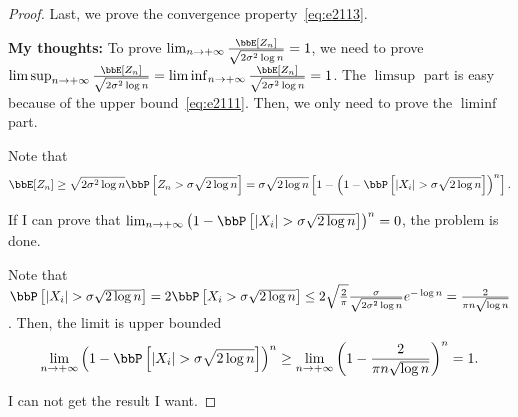 \documentclass[11pt]{article}
\newcommand{\of}[1]{\left(#1\right)}
\newcommand{\off}[1]{\left[#1\right]}
\theoremstyle{plain}
\theoremstyle{definition}
\begin{document}
\begin{proof}
	 \vspace{0.2cm}
	 Last, we prove the convergence property~\eqref{eq:e2113}.
	 
	\textbf{My thoughts:} To prove $\lim_{n \rightarrow +\infty}\frac{ \bbE[Z_n]}{\sqrt{2\sigma^2 \log n}}  = 1$, we need to prove $\limsup_{n \rightarrow +\infty}\frac{ \bbE[Z_n]}{\sqrt{2\sigma^2 \log n}}  = \liminf_{n \rightarrow +\infty}\frac{ \bbE[Z_n]}{\sqrt{2\sigma^2 \log n}} = 1$. The $\limsup$ part is easy because of the upper bound~\eqref{eq:e2111}. Then, we only need to prove the $\liminf$ part.
	
	Note that 
	\[\bbE[Z_n] \geq \sqrt{2 \sigma^2 \log n}  \bbP \off{Z_n > \sigma \sqrt{2 \log n}} =  \sigma \sqrt{2\log n} \off{1 - \of{1 - \bbP \off{|X_i| > \sigma \sqrt{2\log n}}   }^n}. \]
	
	If I can prove that $\lim_{n \rightarrow +\infty}\of{1 - \bbP \off{|X_i| > \sigma \sqrt{2\log n}}   }^n = 0 $, the problem is done.
	
	Note that $\bbP \off{|X_i| > \sigma \sqrt{2\log n}}  = 2 \bbP \off{X_i > \sigma \sqrt{2\log n}} \leq 2 \sqrt{\frac{2}{\pi}} \frac{\sigma}{\sqrt{2 \sigma^2 \log n}} e^{-\log n} = \frac{2}{\pi n \sqrt{\log n}}$. Then, the limit is upper bounded
	 \[\lim_{n \rightarrow +\infty}\of{1 - \bbP \off{|X_i| > \sigma \sqrt{2\log n}}   }^n \geq \lim_{n \rightarrow +\infty} \of{1 -  \frac{2}{\pi n \sqrt{\log n}} }^n = 1. \]
	 
	 I can not get the result I want.
	 
	 \iffalse
	 By Markov's inequality, the expectation of $Z_n$ satisfies
	 \begin{equation}
	 	\bbE[Z_n] \geq t \bbP[Z_n \geq t],\quad \text{for all }t \geq 0.
	 \end{equation}
	 By the independence of $\{X_i\}_{i=1}^n$, the tail probability of $Z_n$ is
	 \begin{equation}
	 	\bbP[Z_n \geq t] = 1 - (1 - \bbP(|X_1| \geq t))^n.
	 \end{equation}
	 
	 Let $t = \sqrt{2\sigma^2 \log n}$. By equation~\eqref{eq:e211proupper}, the tail probability of $X_1$ satisfies
	 \begin{equation}
	 	\bbP(|X_1| \geq \sqrt{2\sigma^2 \log n}) \leq \frac{2}{\sqrt{ \pi \log n}} \frac{1}{n} \leq \frac{1}{n},\quad \text{for all } n \geq 5.
	 \end{equation}	 
	 Hence, the tail probability of $Z_n$ with $t = \sqrt{2\sigma^2 \log n} $satisfies
	 \begin{equation}
	 	\bbP[Z_n \geq t] \geq 1 - 
	 \end{equation}
	 \fi
\end{proof}
\end{document}
